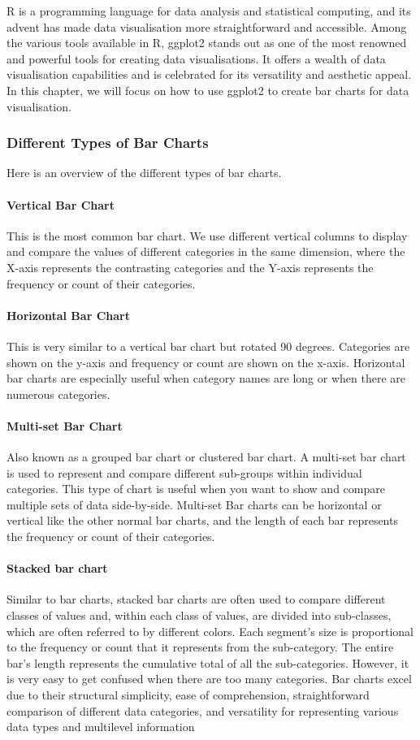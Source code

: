 \documentclass{article}\usepackage[]{graphicx}\usepackage[]{xcolor}
\begin{document}
\noindent
R is a programming language for data analysis and statistical computing, and its advent has made data visualisation more straightforward and accessible. Among the various tools available in R, ggplot2 stands out as one of the most renowned and powerful tools for creating data visualisations. It offers a wealth of data visualisation capabilities and is celebrated for its versatility and aesthetic appeal. In this chapter, we will focus on how to use ggplot2 to create bar charts for data visualisation.

\subsubsection{Different Types of Bar Charts}
Here is an overview of the different types of bar charts. \\
\paragraph{Vertical Bar Chart}
This is the most common bar chart. We use different vertical columns to display and compare the values of different categories in the same dimension, where the X-axis represents the contrasting categories and the Y-axis represents the frequency or count of their categories.\\
\paragraph{Horizontal Bar Chart}
This is very similar to a vertical bar chart but rotated 90 degrees. Categories are shown on the y-axis and frequency or count are shown on the x-axis. Horizontal bar charts are especially useful when category names are long or when there are numerous categories.
\paragraph{Multi-set Bar Chart}
Also known as a grouped bar chart or clustered bar chart. A multi-set bar chart is used to represent and compare different sub-groups within individual categories. This type of chart is useful when you want to show and compare multiple sets of data side-by-side.
Multi-set Bar charts can be horizontal or vertical like the other normal bar charts, and the length of each bar represents the frequency or count of their categories.
\paragraph{Stacked bar chart}
Similar to bar charts, stacked bar charts are often used to compare different classes of values and, within each class of values, are divided into sub-classes, which are often referred to by different colors. Each segment's size is proportional to the frequency or count that it represents from the sub-category. The entire bar's length represents the cumulative total of all the sub-categories.
However, it is very easy to get confused when there are too many categories.
Bar charts excel due to their structural simplicity, ease of comprehension, straightforward comparison of different data categories, and versatility for representing various data types and multilevel information
\end{document}
